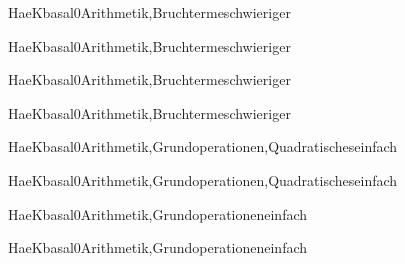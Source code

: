 \documentclass[12pt]{article}
\begin{document}
\begin{Add}{HaeK}{basal0}{Arithmetik,Bruchterme}{schwieriger}
\solution{ }
\end{Add}
\begin{Add}{HaeK}{basal0}{Arithmetik,Bruchterme}{schwieriger}
\end{Add}

\begin{Add}{HaeK}{basal0}{Arithmetik,Bruchterme}{schwieriger}
\solution{ }
\end{Add}
\begin{Add}{HaeK}{basal0}{Arithmetik,Bruchterme}{schwieriger}
\end{Add}

\begin{Add}{HaeK}{basal0}{Arithmetik,Grundoperationen,Quadratisches}{einfach}
\solution{ }
\end{Add}
\begin{Add}{HaeK}{basal0}{Arithmetik,Grundoperationen,Quadratisches}{einfach}
\end{Add}

\begin{Add}{HaeK}{basal0}{Arithmetik,Grundoperationen}{einfach}
\solution{ }
\end{Add}
\begin{Add}{HaeK}{basal0}{Arithmetik,Grundoperationen}{einfach}
\end{Add}
\end{document}
